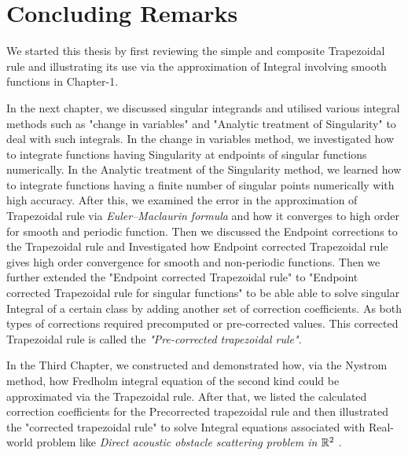 \documentclass[../document.tex]{subfiles}
\begin{document}
	\chapter{Concluding Remarks}
	
	
	
	We started this thesis by first reviewing the simple and composite Trapezoidal rule and illustrating its use via the approximation of Integral involving smooth functions in Chapter-1.

	\vspace{10mm}

	In the next chapter, we discussed singular integrands and utilised various integral methods such as "change in variables" and "Analytic treatment of Singularity" to deal with such integrals. In the change in variables method, we investigated how to integrate functions having Singularity at endpoints of singular functions numerically. In the Analytic treatment of the Singularity method, we learned how to integrate functions having a finite number of singular points numerically with high accuracy. After this, we examined the error in the approximation of Trapezoidal rule via \emph{Euler–Maclaurin formula} and how it converges to high order for smooth and periodic function.  Then we discussed the Endpoint corrections to the Trapezoidal rule and Investigated how Endpoint corrected Trapezoidal rule gives high order convergence for smooth and non-periodic functions. Then we further extended the "Endpoint corrected Trapezoidal rule"  to "Endpoint corrected Trapezoidal rule for singular functions" to be able able to solve singular Integral of a certain class by adding another set of correction coefficients. As both types of corrections required precomputed or pre-corrected values. This corrected  Trapezoidal rule is called the \emph{"Pre-corrected trapezoidal rule"}.

	\vspace{10mm}

	In the Third Chapter, we constructed and demonstrated how, via the Nystrom method, how Fredholm integral equation of the second kind could be approximated via the Trapezoidal rule.
	After that, we listed the calculated correction coefficients for the Precorrected trapezoidal rule and then illustrated the "corrected trapezoidal rule" to solve Integral equations associated with Real-world problem like \emph{Direct acoustic obstacle scattering problem in $\mathbb{R}^2$ }.
\end{document}

